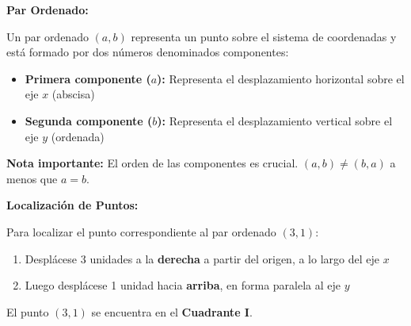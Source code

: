 \begin{definition}
\textbf{Par Ordenado:}

Un par ordenado $(a, b)$ representa un punto sobre el sistema de coordenadas y está formado por dos números denominados componentes:

\begin{itemize}
    \item \textbf{Primera componente ($a$):} Representa el desplazamiento horizontal sobre el eje $x$ (abscisa)
    \item \textbf{Segunda componente ($b$):} Representa el desplazamiento vertical sobre el eje $y$ (ordenada)
\end{itemize}

\textbf{Nota importante:} El orden de las componentes es crucial. $(a, b) \neq (b, a)$ a menos que $a = b$.
\end{definition}

\begin{center}
\end{center}

\begin{example}
\textbf{Localización de Puntos:}

Para localizar el punto correspondiente al par ordenado $(3, 1)$:
\begin{enumerate}
    \item Desplácese 3 unidades a la \textbf{derecha} a partir del origen, a lo largo del eje $x$
    \item Luego desplácese 1 unidad hacia \textbf{arriba}, en forma paralela al eje $y$
\end{enumerate}

El punto $(3, 1)$ se encuentra en el \textbf{Cuadrante I}.
\end{example}

